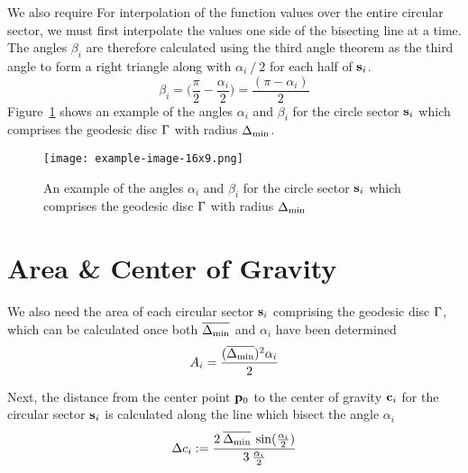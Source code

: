 We also require For interpolation of the function values over the entire circular sector, we must first interpolate the values one side of the bisecting line at a time. The angles $\beta_i$ are therefore calculated using the third angle theorem as the third angle to form a right triangle along with $\alpha_i\mathbin{/}2$ for each half of $\mathbf{s}_i$. 
\begin{equation}
	\beta_i = \Big(\frac{\pi}{2} - \frac{\alpha_i}{2}\Big) = \frac{(\pi - \alpha_i)}{2}
	\label{eq:betaFromHalfAlpha}
\end{equation}%
%
Figure~\ref{fig:angles} shows an example of the angles $\alpha_i$ and $\beta_i$ for the circle sector $\mathbf{s}_i$  which comprises the geodesic disc $\Gamma$ with radius $\Delta_\text{min}$.
\begin{figure}[ht]
\ffigbox
	{\texttt{[image: example-image-16x9.png]}}
	{\caption[The angles $\alpha_i$ and $\beta_i$]{An example of the angles $\alpha_i$ and $\beta_i$ for the circle sector $\mathbf{s}_i$  which comprises the geodesic disc $\Gamma$ with radius $\Delta_\text{min}$}\label{fig:angles}}
\end{figure}%
%
\section{Area \& Center of Gravity}
\label{cFONSsACG}
We also need the area of each circular sector $\mathbf{s}_i$ comprising the geodesic disc $\Gamma$, which can be calculated once both $\overline{\Delta_\text{min}}$ and $\alpha_i$ have been determined
\begin{equation}
	A_i = \frac{(\overline{\Delta_\text{min}})^2\alpha_i}{2}
	\label{eq:circularSectorArea}
\end{equation}
%
%

Next, the distance from the center point $\mathbf{p}_0$ to the center of gravity $\mathbf{c}_i$ for the circular sector $\mathbf{s}_i$ is calculated along the line which bisect the angle $\alpha_i$
\begin{equation}
	\Delta c_i := \frac{2\:\overline{\Delta_\text{min}}\:\sin(\frac{\alpha_i}{2})}{3\:\frac{\alpha_i}{2}}
	\label{eq:distToCoG}
\end{equation}
%
%

